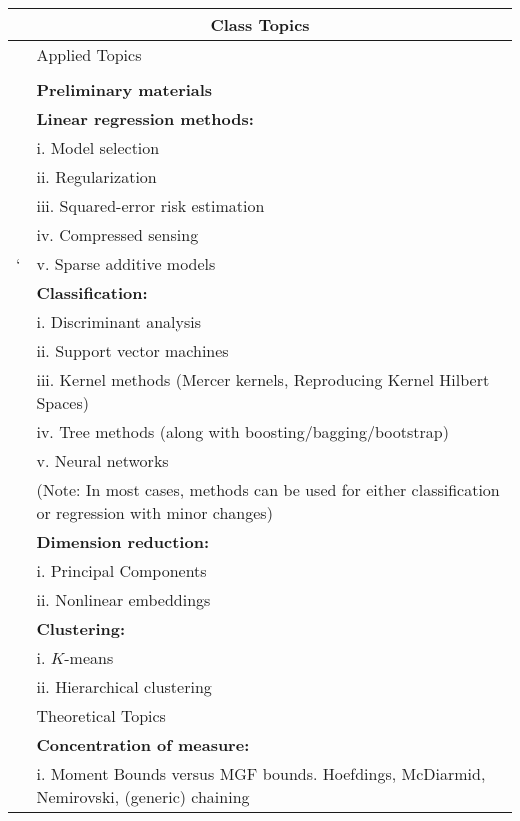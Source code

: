 \documentclass[11pt]{article}
\begin{document}
\newpage



\begin{table}[!h]
\begin{tabular}{lp{6in}}
\multicolumn{2}{c}{{\bf \Large Class Topics}} \\
\hline
\hline
                          & Applied Topics \\
\hline
\\
 &   \textbf{Preliminary materials} \\
 &   \textbf{Linear regression methods:}  \\
           & i. Model selection \\
           & ii. Regularization \\
           & iii. Squared-error risk estimation \\
           & iv. Compressed sensing \\`
           & v. Sparse additive models \\
 &   \textbf{Classification:}  \\
           & i. Discriminant analysis \\
           & ii. Support vector machines \\
           & iii. Kernel methods (Mercer kernels, Reproducing Kernel Hilbert Spaces)\\
           & iv. Tree methods (along with boosting/bagging/bootstrap)\\
           & v. Neural networks \\
          &  {\scriptsize (Note: In most cases, methods can be used for either classification or regression with minor
                         changes)}\\
 &  \textbf{Dimension reduction:}  \\
           & i. Principal Components \\
           & ii. Nonlinear embeddings \\ 
 &   \textbf{Clustering:} \\
           & i. $K$-means \\
           & ii. Hierarchical clustering \\           
\hline
                          & Theoretical Topics \\           
\hline                          
 &  \textbf{Concentration of measure:} \\
           & i. Moment Bounds versus MGF bounds. Hoefdings, McDiarmid, Nemirovski, (generic) chaining \\

\end{tabular}
\end{table}
\end{document}
